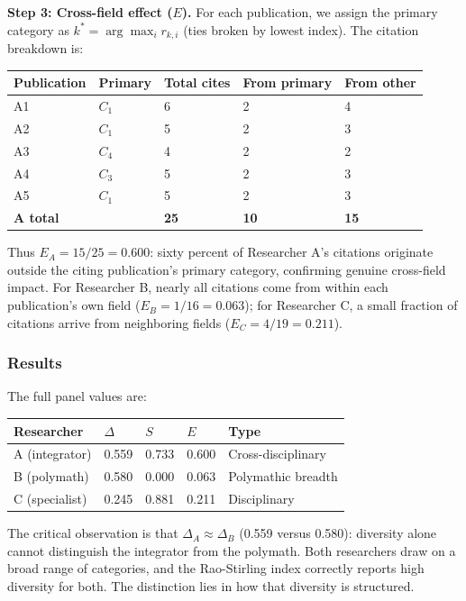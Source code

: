 \documentclass[
]{article}
\begin{document}
\textbf{Step 3: Cross-field effect (\(E\)).} For each publication, we
assign the primary category as \(k^* = \arg\max_i r_{k,i}\) (ties broken
by lowest index). The citation breakdown is:

\begin{longtable}[]{@{}lllll@{}}
\toprule
Publication & Primary & Total cites & From primary & From other \\
\midrule
\endhead
A1 & \(C_1\) & 6 & 2 & 4 \\
A2 & \(C_1\) & 5 & 2 & 3 \\
A3 & \(C_4\) & 4 & 2 & 2 \\
A4 & \(C_3\) & 5 & 2 & 3 \\
A5 & \(C_1\) & 5 & 2 & 3 \\
\textbf{A total} & & \textbf{25} & \textbf{10} & \textbf{15} \\
\bottomrule
\end{longtable}

Thus \(E_A = 15/25 = 0.600\): sixty percent of Researcher A's citations
originate outside the citing publication's primary category, confirming
genuine cross-field impact. For Researcher B, nearly all citations come
from within each publication's own field (\(E_B = 1/16 = 0.063\)); for
Researcher C, a small fraction of citations arrive from neighboring
fields (\(E_C = 4/19 = 0.211\)).

\hypertarget{results}{%
\subsubsection{Results}\label{results}}

The full panel values are:

\begin{longtable}[]{@{}lllll@{}}
\toprule
Researcher & \(\Delta\) & \(S\) & \(E\) & Type \\
\midrule
\endhead
A (integrator) & 0.559 & 0.733 & 0.600 & Cross-disciplinary \\
B (polymath) & 0.580 & 0.000 & 0.063 & Polymathic breadth \\
C (specialist) & 0.245 & 0.881 & 0.211 & Disciplinary \\
\bottomrule
\end{longtable}

The critical observation is that \(\Delta_A \approx \Delta_B\) (0.559
versus 0.580): diversity alone cannot distinguish the integrator from
the polymath. Both researchers draw on a broad range of categories, and
the Rao-Stirling index correctly reports high diversity for both. The
distinction lies in how that diversity is structured.
\end{document}
